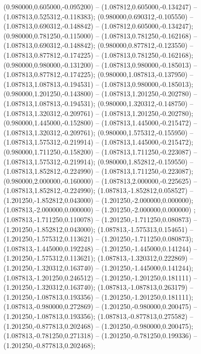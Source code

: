  (0.980000,0.605000,-0.095200) -- (1.087812,0.605000,-0.134247) -- (1.087813,0.525312,-0.118383);
 (0.980000,0.690312,-0.105550) -- (1.087813,0.690312,-0.148842) -- (1.087812,0.605000,-0.134247);
 (0.980000,0.781250,-0.115000) -- (1.087813,0.781250,-0.162168) -- (1.087813,0.690312,-0.148842);
 (0.980000,0.877812,-0.123550) -- (1.087813,0.877812,-0.174225) -- (1.087813,0.781250,-0.162168);
 (0.980000,0.980000,-0.131200) -- (1.087813,0.980000,-0.185013) -- (1.087813,0.877812,-0.174225);
 (0.980000,1.087813,-0.137950) -- (1.087813,1.087813,-0.194531) -- (1.087813,0.980000,-0.185013);
 (0.980000,1.201250,-0.143800) -- (1.087813,1.201250,-0.202780) -- (1.087813,1.087813,-0.194531);
 (0.980000,1.320312,-0.148750) -- (1.087813,1.320312,-0.209761) -- (1.087813,1.201250,-0.202780);
 (0.980000,1.445000,-0.152800) -- (1.087813,1.445000,-0.215472) -- (1.087813,1.320312,-0.209761);
 (0.980000,1.575312,-0.155950) -- (1.087813,1.575312,-0.219914) -- (1.087813,1.445000,-0.215472);
 (0.980000,1.711250,-0.158200) -- (1.087813,1.711250,-0.223087) -- (1.087813,1.575312,-0.219914);
 (0.980000,1.852812,-0.159550) -- (1.087813,1.852812,-0.224990) -- (1.087813,1.711250,-0.223087);
 (0.980000,2.000000,-0.160000) -- (1.087813,2.000000,-0.225625) -- (1.087813,1.852812,-0.224990);
 (1.087813,-1.852812,0.058527) -- (1.201250,-1.852812,0.043000) -- (1.201250,-2.000000,0.000000);
 (1.087813,-2.000000,0.000000) -- (1.201250,-2.000000,0.000000) ;
 (1.087813,-1.711250,0.110078) -- (1.201250,-1.711250,0.080873) -- (1.201250,-1.852812,0.043000);
 (1.087813,-1.575313,0.154651) -- (1.201250,-1.575312,0.113621) -- (1.201250,-1.711250,0.080873);
 (1.087813,-1.445000,0.192248) -- (1.201250,-1.445000,0.141244) -- (1.201250,-1.575312,0.113621);
 (1.087813,-1.320312,0.222869) -- (1.201250,-1.320312,0.163740) -- (1.201250,-1.445000,0.141244);
 (1.087813,-1.201250,0.246512) -- (1.201250,-1.201250,0.181111) -- (1.201250,-1.320312,0.163740);
 (1.087813,-1.087813,0.263179) -- (1.201250,-1.087813,0.193356) -- (1.201250,-1.201250,0.181111);
 (1.087813,-0.980000,0.272869) -- (1.201250,-0.980000,0.200475) -- (1.201250,-1.087813,0.193356);
 (1.087813,-0.877813,0.275582) -- (1.201250,-0.877813,0.202468) -- (1.201250,-0.980000,0.200475);
 (1.087813,-0.781250,0.271318) -- (1.201250,-0.781250,0.199336) -- (1.201250,-0.877813,0.202468);
